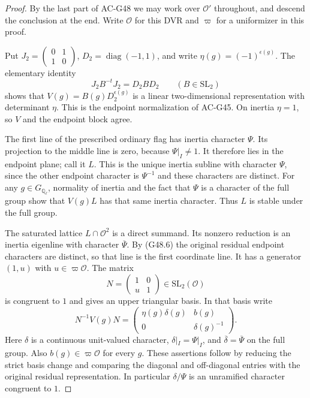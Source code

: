 \begin{proof}
By the last part of AC-G48 we may work over $\mathcal O'$
throughout, and descend the conclusion at the end.
Write $\mathcal O$ for this DVR and $\varpi$ for a
uniformizer in this proof.

Put $J_2=\left(\begin{smallmatrix}0&1\\1&0\end{smallmatrix}\right)$,
$D_2=\operatorname{diag}(-1,1)$, and write
$\eta(g)=(-1)^{\epsilon(g)}$.  The elementary identity
\[
 J_2B^{-t}J_2=D_2BD_2\qquad(B\in\mathrm{SL}_2)
\]
shows that
$V(g)=B(g)D_2^{\epsilon(g)}$ is a linear
two-dimensional representation with determinant $\eta$.
This is the endpoint normalization of AC-G45.
On inertia $\eta=1$, so $V$ and the endpoint block agree.

The first line of the prescribed ordinary flag has inertia
character $\Psi$.  Its projection to the middle line is
zero, because $\Psi|_I\ne1$.  It therefore lies in the
endpoint plane; call it $L$.  This is the unique inertia
subline with character $\Psi$, since the other endpoint
character is $\Psi^{-1}$ and these characters are distinct.
For any $g\in G_{\mathbb Q_\ell}$, normality of inertia
and the fact that $\Psi$ is a character of the full group
show that $V(g)L$ has that same inertia character.  Thus
$L$ is stable under the full group.

The saturated lattice $L\cap\mathcal O^2$ is a direct
summand.  Its nonzero reduction is an inertia eigenline with
character $\overline\Psi$.  By (G48.6) the original
residual endpoint characters are distinct, so that line is
the first coordinate line.  It has a generator $(1,u)$ with
$u\in\varpi\mathcal O$.  The matrix
\[
              N=\begin{pmatrix}1&0\\u&1\end{pmatrix}
               \in\mathrm{SL}_2(\mathcal O)           \tag{G48.7}
\]
is congruent to $1$ and gives an upper triangular basis.
In that basis write
\[
 N^{-1}V(g)N=
 \begin{pmatrix}\eta(g)\delta(g)&b(g)\\
                 0&\delta(g)^{-1}\end{pmatrix}.       \tag{G48.8}
\]
Here $\delta$ is a continuous unit-valued character,
$\delta|_I=\Psi|_I$, and
$\overline\delta=\overline\Psi$ on the full group.
Also $b(g)\in\varpi\mathcal O$ for every $g$.
These assertions follow by reducing the strict basis change
and comparing the diagonal and off-diagonal entries with
the original residual representation.  In particular
$\delta/\Psi$ is an unramified character congruent to $1$.


\end{proof}
